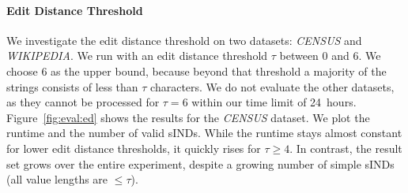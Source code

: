 \paragraph{Edit Distance Threshold}
%
%
We investigate the edit distance threshold on two datasets:  \emph{CENSUS} and \emph{WIKIPEDIA}.
We run \sawfish with an edit distance threshold $\tau$ between $0$ and $6$.
We choose 6 as the upper bound, because beyond that threshold a majority of the strings consists of less than $\tau$ characters.
We do not evaluate the other datasets, as they cannot be processed for $\tau = 6$ within our time limit of 24~hours.
Figure~\ref{fig:eval:ed} shows the results for the \emph{CENSUS} dataset.
We plot the runtime and the number of valid sINDs.
While the runtime stays almost constant for lower edit distance thresholds, it quickly rises for $\tau \geq 4$.
In contrast, the result set grows over the entire experiment, despite a growing number of simple sINDs (all value lengths are $\leq \tau$).

